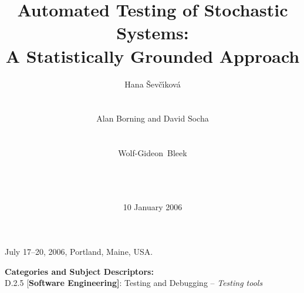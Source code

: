 \documentclass{sig-alternate}
\begin{document}
 {July 17--20, 2006, Portland, Maine, USA.}




\title{Automated Testing of Stochastic Systems: \\
A Statistically Grounded Approach}


\author{
%
\alignauthor Hana {\v{S}}ev\v{c}\'{\i}kov\'{a}\\
       \\
       \\
\alignauthor Alan Borning and David Socha \\
       \\
       \\
\alignauthor Wolf-Gideon~Bleek\\
       \\
       \\
       \\
}


\date{10 January 2006}
\maketitle 



\vspace{1mm}
\noindent
{\bf Categories and Subject Descriptors:} \\{D.2.5} {[\bf Software
  Engineering]}: {Testing and Debugging -- {\it Testing tools}}

\end{document}
